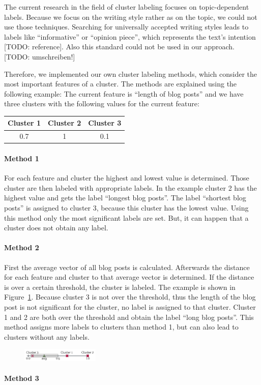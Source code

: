The current research in the field of cluster labeling focuses on topic-dependent labels.
Because we focus on the writing style rather as on the topic, we could not use those techniques.
Searching for universally accepted writing styles leads to labels like ``informative'' or ``opinion piece'', which represents the text's intention [TODO: reference].
Also this standard could not be used in our approach.
[TODO: umschreiben!]

Therefore, we implemented our own cluster labeling methods, which consider the most important features of a cluster.
The methods are explained using the following example:
The current feature is ``length of blog posts'' and we have three clusters with the following values for the current feature:
\begin{center}
\begin{tabular}{c|c|c}
  Cluster 1 & Cluster 2 & Cluster 3 \\ \hline
  0.7 & 1 & 0.1 \\
 \end{tabular}
\end{center}
\paragraph{Method 1}
For each feature and cluster the highest and lowest value is determined.
Those cluster are then labeled with appropriate labels.
In the example cluster 2 has the highest value and gets the label ``longest blog posts''.
The label ``shortest blog posts'' is assigned to cluster 3, because this cluster has the lowest value.
Using this method only the most significant labels are set.
But, it can happen that a cluster does not obtain any label.

\paragraph{Method 2}
First the average vector of all blog posts is calculated.
Afterwards the distance for each feature and cluster to that average vector is determined.
If the distance is over a certain threshold, the cluster is labeled.
The example is shown in Figure~\ref{cluster_labeling_2}.
Because cluster 3 is not over the threshold, thus the length of the blog post is not significant for the cluster, no label is assigned to that cluster.
Cluster 1 and 2 are both over the threshold and obtain the label ``long blog posts''.
This method assigns more labels to clusters than method 1, but can also lead to clusters without any labels.

\begin{figure}[ht]
	\centering
	\includegraphics[width=0.33\textwidth]{images/cluster_labeling_2.pdf}
	\caption{}
	\label{cluster_labeling_2}
\end{figure}

\paragraph{Method 3}



